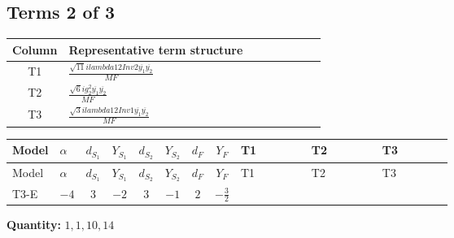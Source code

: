 \documentclass[8pt]{article}
\begin{document}
\begin{landscape}
\subsection*{Terms 2 of 3}
\begin{center}
\begin{tabular}{@{}c >{\raggedright\arraybackslash}p{0.82\linewidth}@{}}
\toprule
Column & Representative term structure \\
\midrule
T1 & \(\displaystyle \frac{\sqrt{11} i lambda12Inv2 \overline{y_{1}} \overline{y_{2}}}{MF}\) \\
\midrule
T2 & \(\displaystyle \frac{\sqrt{6} i g_{2}^{2} \overline{y_{1}} \overline{y_{2}}}{MF}\) \\
\midrule
T3 & \(\displaystyle \frac{\sqrt{3} i lambda12Inv1 \overline{y_{1}} \overline{y_{2}}}{MF}\) \\
\midrule
\bottomrule
\end{tabular}
\end{center}
\smallskip
\tiny
\begin{longtable}{@{}llcccccc >{\raggedright\arraybackslash}p{0.21\linewidth} >{\raggedright\arraybackslash}p{0.21\linewidth} >{\raggedright\arraybackslash}p{0.21\linewidth}@{}}
\toprule
Model & $\alpha$ & $d_{S_1}$ & $Y_{S_1}$ & $d_{S_2}$ & $Y_{S_2}$ & $d_F$ & $Y_F$ & T1 & T2 & T3 \\
\midrule
\endfirsthead
\toprule
Model & $\alpha$ & $d_{S_1}$ & $Y_{S_1}$ & $d_{S_2}$ & $Y_{S_2}$ & $d_F$ & $Y_F$ & T1 & T2 & T3 \\
\midrule
\endhead
T3-E & $-4$ & $3$ & $-2$ & $3$ & $-1$ & $2$ & $-\frac{3}{2}$ & \scriptsize\adjustbox{max width=\linewidth}{$\begin{gathered} - \frac{3 \sqrt{11} i lambda12Inv2 \overline{y_{1}} \overline{y_{2}}}{22 MF}\end{gathered}$} & \scriptsize\adjustbox{max width=\linewidth}{$\begin{gathered} - \frac{\sqrt{6} i g_{2}^{2} \overline{y_{1}} \overline{y_{2}}}{3 MF}\end{gathered}$} & \scriptsize\adjustbox{max width=\linewidth}{$\begin{gathered} \frac{\sqrt{3} i lambda12Inv1 \overline{y_{1}} \overline{y_{2}}}{6 MF}\end{gathered}$} \\
\midrule
\bottomrule
\end{longtable}
\clearpage
\noindent\textbf{Quantity: }$\mathrm{1,1,10,14}$\par\smallskip

\end{landscape}
\end{document}
